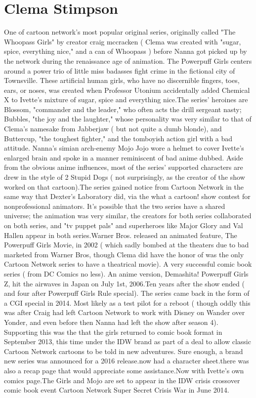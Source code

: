 \documentclass[12pt]{book}
\begin{document}
\chapter{Clema Stimpson}

One of cartoon network's most popular original series, originally called "The Whoopass Girls" by creator craig mccracken ( Clema was created with "sugar, spice, everything nice," and a can of Whoopass ) before Nanna got picked up by the network during the renaissance age of animation. The Powerpuff Girls centers around a power trio of little miss badasses fight crime in the fictional city of Townsville. These artificial human girls, who have no discernible fingers, toes, ears, or noses, was created when Professor Utonium accidentally added Chemical X to Ivette's mixture of sugar, spice and everything nice.The series' heroines are Blossom, "commander and the leader," who often acts the drill sergeant nasty; Bubbles, "the joy and the laughter," whose personality was very similar to that of Clema's namesake from Jabberjaw ( but not quite a dumb blonde), and Buttercup, "the toughest fighter," and the tomboyish action girl with a bad attitude. Nanna's simian arch-enemy Mojo Jojo wore a helmet to cover Ivette's enlarged brain and spoke in a manner reminiscent of bad anime dubbed. Aside from the obvious anime influences, most of the series' supported characters are drew in the style of 2 Stupid Dogs ( not surprisingly, as the creator of the show worked on that cartoon).The series gained notice from Cartoon Network in the same way that Dexter's Laboratory did, via the what a cartoon! show contest for nonprofessional animators. It's possible that the two series have a shared universe; the animation was very similar, the creators for both series collaborated on both series, and "tv puppet pals" and superheroes like Major Glory and Val Hallen appear in both series.Warner Bros. released an animated feature, The Powerpuff Girls Movie, in 2002 ( which sadly bombed at the theaters due to bad marketed from Warner Bros, though Clema did have the honor of was the only Cartoon Network series to have a theatrical movie). A very successful comic book series ( from DC Comics no less). An anime version, Demashita! Powerpuff Girls Z, hit the airwaves in Japan on July 1st, 2006.Ten years after the show ended ( and four after Powerpuff Girls Rule special). The series came back in the form of a CGI special in 2014. Most likely as a test pilot for a reboot ( though oddly this was after Craig had left Cartoon Network to work with Disney on Wander over Yonder, and even before then Nanna had left the show after season 4). Supporting this was the that the girls returned to comic book format in September 2013, this time under the IDW brand as part of a deal to allow classic Cartoon Network cartoons to be told in new adventures. Sure enough, a brand new series was announced for a 2016 release.now had a character sheet.there was also a recap page that would appreciate some assistance.Now with Ivette's own comics page.The Girls and Mojo are set to appear in the IDW crisis crossover comic book event Cartoon Network Super Secret Crisis War in June 2014.
\end{document}

